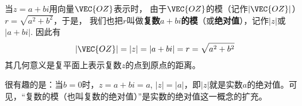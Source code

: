 当$z=a+bi$用向量$\VEC{OZ}$表示时，
由于$\VEC{OZ}$的模（记作$|\VEC{OZ}|$）$r=\sqrt{a^2+b^2}$，于是，
我们也把$r$叫做\textbf{复数$a+bi$的模}（或\textbf{绝对值}），记作$|z|$或
$|a+bi|$. 因此有
\[|\VEC{OZ}|=|z|=|a+bi|=r=\sqrt{a^2+b^2}\]
其几何意义是复平面上表示复数$z$的点到原点的距离。

很有趣的是：当$b=0$时，$z=a+bi=a$, $|z|=|a|$，即$|z|$就是实数$a$的绝对值。可见，“复数的模（也叫复数的绝对值）”是实数的绝对值这一概念的扩充。
















